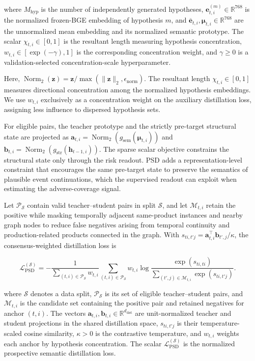 \documentclass[letterpaper]{article} %
\begin{document}
where \(M_{\mathrm{hyp}}\) is the number of independently generated hypotheses, \(\mathbf e_{t,i}^{(m)}\in\mathbb R^{768}\) is the normalized frozen-BGE embedding of hypothesis \(m\), and \(\overline{\mathbf e}_{t,i},\boldsymbol\mu_{t,i}\in\mathbb R^{768}\) are the unnormalized mean embedding and its normalized semantic prototype. The scalar \(\chi_{t,i}\in[0,1]\) is the resultant length measuring hypothesis concentration, \(w_{t,i}\in[\exp(-\gamma),1]\) is the corresponding concentration weight, and \(\gamma\geq0\) is a validation-selected concentration-scale hyperparameter.

Here, \(\operatorname{Norm}_2(\mathbf z)=\mathbf z/\max(\lVert\mathbf z\rVert_2,\epsilon_{\mathrm{norm}})\). The resultant length \(\chi_{t,i}\in[0,1]\) measures directional concentration among the normalized hypothesis embeddings. We use \(w_{t,i}\) exclusively as a concentration weight on the auxiliary distillation loss, assigning less influence to dispersed hypothesis sets.

For eligible pairs, the teacher prototype and the strictly pre-target structural state are projected as \(\mathbf a_{t,i}=\operatorname{Norm}_2(g_{\mathrm{sem}}(\boldsymbol\mu_{t,i}))\) and \(\mathbf b_{t,i}=\operatorname{Norm}_2(g_{\mathrm{str}}(\mathbf h_{t-1,i}))\). The sparse scalar objective constrains the structural state only through the risk readout. PSD adds a representation-level constraint that encourages the same pre-target state to preserve the semantics of plausible event continuations, which the supervised readout can exploit when estimating the adverse-coverage signal.

Let \(\mathcal P_{\mathcal S}\) contain valid teacher--student pairs in split \(\mathcal S\), and let \(\mathcal M_{t,i}\) retain the positive while masking temporally adjacent same-product instances and nearby graph nodes to reduce false negatives arising from temporal continuity and production-related products connected in the graph. With \(s_{ti,t'j}=\mathbf a_{t,i}^{\top}\mathbf b_{t',j}/\kappa\), the consensus-weighted distillation loss is

\begin{equation}
\mathcal L_{\mathrm{PSD}}^{(\mathcal S)}
=
-\frac{1}{\sum_{(t,i)\in\mathcal P_{\mathcal S}}w_{t,i}}
\sum_{(t,i)\in\mathcal P_{\mathcal S}}
w_{t,i}
\log
\frac{\exp(s_{ti,ti})}
{\sum_{(t',j)\in\mathcal M_{t,i}}\exp(s_{ti,t'j})}.
\label{eq:psd-loss}
\end{equation}

where \(\mathcal S\) denotes a data split, \(\mathcal P_{\mathcal S}\) is its set of eligible teacher--student pairs, and \(\mathcal M_{t,i}\) is the candidate set containing the positive pair and retained negatives for anchor \((t,i)\). The vectors \(\mathbf a_{t,i},\mathbf b_{t,i}\in\mathbb R^{d_{\mathrm{dist}}}\) are unit-normalized teacher and student projections in the shared distillation space, \(s_{ti,t'j}\) is their temperature-scaled cosine similarity, \(\kappa>0\) is the contrastive temperature, and \(w_{t,i}\) weights each anchor by hypothesis concentration. The scalar \(\mathcal L_{\mathrm{PSD}}^{(\mathcal S)}\) is the normalized prospective semantic distillation loss.
\end{document}
